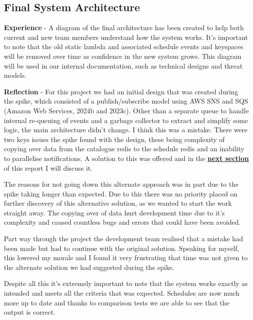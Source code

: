   \subsection{Final System Architecture}

  \textbf{Experience} - A diagram of the final architecture has been created to help both current and new team members understand how the system works.
  It's important to note that the old static lambda and associated schedule events and keyspaces will be removed over time as confidence in the new system 
  grows. This diagram will be used in our internal documentation, such as technical designs and threat models.

  \vspace{0.2cm}
  \textbf{Reflection} - For this project we had an initial design that was created during the spike, which consisted of a publish/subscribe model using
  AWS SNS and SQS (Amazon Web Services, 2024b and 2023c). Other than a separate queue to handle internal re-queuing of events and a garbage collector to 
  extract and simplify some logic, the main architecture didn't change. I think this was a mistake. There were two keys issues the spike found with the design,
  these being complexity of copying over data from the catalogue redis to the schedule redis and an inability to parallelise notifications. A solution to this 
  was offered and in the \hyperref[sec:dynamo]{\textbf{next section}} of this report I will discuss it. 

  The reasons for not going down this alternate approach was in part due to the spike taking longer than expected. Due to this there was no priority placed 
  on further discovery of this alternative solution, as we wanted to start the work straight away. The copying over of data hurt development time due to 
  it's complexity and caused countless bugs and errors that could have been avoided. 
  
  Part way through the project the development team realised that a mistake had been made but had to continue with the original solution. 
  Speaking for myself, this lowered my morale and I found it very frustrating that time was not given to the alternate solution we had suggested during 
  the spike.

  Despite all this it's extremely important to note that the system works exactly as intended and meets all the criteria that was expected. Schedules are 
  now much more up to date and thanks to comparison tests we are able to see that the output is correct.

